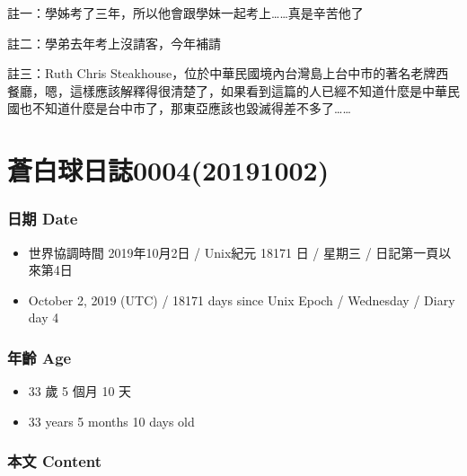 \documentclass[a5paper, 12pt
]{book}
\providecommand{\tightlist}{%
  \setlength{\itemsep}{0pt}\setlength{\parskip}{0pt}}
\begin{document}
註一：學姊考了三年，所以他會跟學妹一起考上\ldots\ldots 真是辛苦他了

註二：學弟去年考上沒請客，今年補請

註三：Ruth Chris
Steakhouse，位於中華民國境內台灣島上台中市的著名老牌西餐廳，嗯，這樣應該解釋得很清楚了，如果看到這篇的人已經不知道什麼是中華民國也不知道什麼是台中市了，那東亞應該也毀滅得差不多了\ldots\ldots{}

\hypertarget{ux84bcux767dux7403ux65e5ux8a8c000420191002}{%
\section{蒼白球日誌0004(20191002)}\label{ux84bcux767dux7403ux65e5ux8a8c000420191002}}

\hypertarget{ux65e5ux671f-date-1}{%
\subsubsection{日期 Date}\label{ux65e5ux671f-date-1}}

\begin{itemize}
\tightlist
\item
  世界協調時間 2019年10月2日 / Unix紀元 18171 日 / 星期三 /
  日記第一頁以來第4日
\item
  October 2, 2019 (UTC) / 18171 days since Unix Epoch / Wednesday /
  Diary day 4
\end{itemize}

\hypertarget{ux5e74ux9f61-age-1}{%
\subsubsection{年齡 Age}\label{ux5e74ux9f61-age-1}}

\begin{itemize}
\tightlist
\item
  33 歲 5 個月 10 天
\item
  33 years 5 months 10 days old
\end{itemize}

\hypertarget{ux672cux6587-content-1}{%
\subsubsection{本文 Content}\label{ux672cux6587-content-1}}
\end{document}
